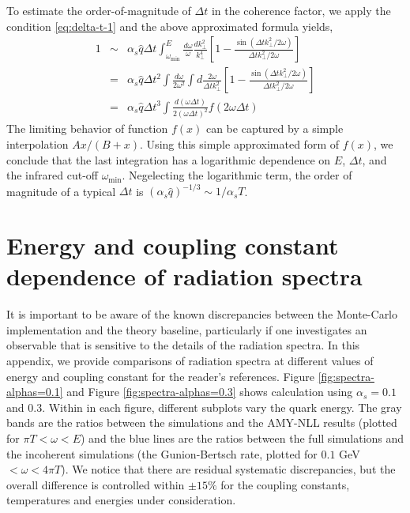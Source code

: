 \documentclass[aps, prc, reprint, amsmath, groupedaddress, nofootinbib]{revtex4-1}
\begin{document}
\begin{appendices}
To estimate the order-of-magnitude of $\Delta t$ in the coherence factor, we apply the condition \ref{eq:delta-t-1} and the above approximated formula yields,
\begin{eqnarray}
\nonumber
1 &\sim& \alpha_s\hat{q}\Delta t \int_{\omega_{\min}}^{E} \frac{d\omega}{\omega}  \frac{dk_\perp^2}{k_\perp^4}  \left[1-\frac{\sin(\Delta t k_\perp^2/2\omega)}{\Delta t k_\perp^2/2\omega}\right]\\
\nonumber
&=& \alpha_s\hat{q}\Delta t^2 \int \frac{d\omega}{2\omega^2}  \int d\frac{2\omega}{\Delta t k_\perp^2}  \left[1-\frac{\sin(\Delta t k_\perp^2/2\omega)}{\Delta t k_\perp^2/2\omega}\right]\\
&=& \alpha_s\hat{q}\Delta t^3 \int \frac{d(\omega\Delta t)}{2(\omega\Delta t) ^2} f(2\omega\Delta t)
\end{eqnarray}
The limiting behavior of function $f(x)$ can be captured by a simple interpolation $Ax/(B+x)$.
Using this simple approximated form of $f(x)$, we conclude that the last integration has a logarithmic dependence on $E$, $\Delta t$, and the infrared cut-off $\omega_{\min}$.
Negelecting the logarithmic term, the order of magnitude of a typical $\Delta t$ is $(\alpha_s\hat{q})^{-1/3}\sim 1/\alpha_s T$.


\section{Energy and coupling constant dependence of radiation spectra}\label{app:tune-spectrum}
It is important to be aware of the known discrepancies between the Monte-Carlo implementation and the theory baseline, particularly if one investigates an observable that is sensitive to the details of the radiation spectra. 
In this appendix, we provide comparisons of radiation spectra at different values of energy and coupling constant for the reader's references.
Figure \ref{fig:spectra-alphas=0.1} and Figure \ref{fig:spectra-alphas=0.3} shows calculation using $\alpha_s = 0.1$ and $0.3$.
Within in each figure, different subplots vary the quark energy.
The gray bands are the ratios between the simulations and the AMY-NLL results (plotted for $\pi T < \omega < E$) and the blue lines are the ratios between the full simulations and the incoherent simulations (the Gunion-Bertsch rate, plotted for $0.1$ GeV $< \omega < 4\pi T $).
We notice that there are residual systematic discrepancies, but the overall difference is controlled within $\pm 15\%$ for the coupling constants, temperatures and energies under consideration.


\end{appendices}
 
\end{document}
